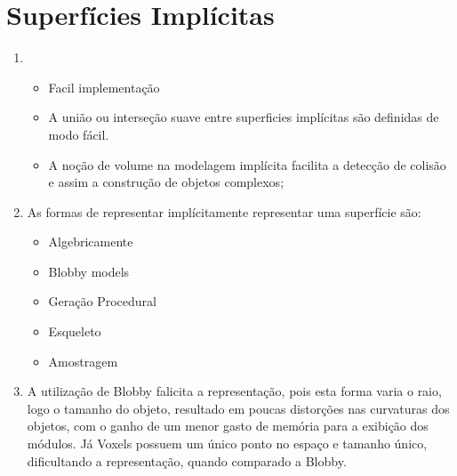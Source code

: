 \section*{Superfícies Implícitas}

	\begin{enumerate} \addtocounter{enumi}{12}
		\item  
			\begin{itemize}
				\item Facil implementação
				\item A união ou interseção suave entre superficies implícitas são definidas de modo fácil.
				\item A noção de volume na modelagem implícita facilita a detecção de colisão e assim a 
				construção de objetos complexos;
			\end{itemize}

		\item 
			As formas de representar implícitamente representar uma
			superfície são:
			\begin{itemize}
				\item Algebricamente
				\item Blobby models 
				\item Geração Procedural 
				\item Esqueleto
				\item Amostragem
			\end{itemize}

		\item A utilização de Blobby falicita a representação, pois
		esta forma varia o raio, logo o tamanho do objeto, resultado em
		poucas distorções nas curvaturas dos objetos, com o ganho de um 
		menor gasto de memória para a exibição dos módulos. Já Voxels possuem 
		um único ponto no espaço e tamanho único, dificultando a representação,
		quando comparado a Blobby.
	\end{enumerate}
